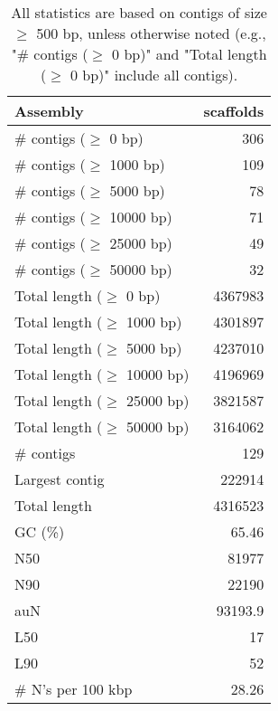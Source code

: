 \documentclass[12pt,a4paper]{article}
\begin{document}
\begin{table}[ht]
\begin{center}
\caption{All statistics are based on contigs of size $\geq$ 500 bp, unless otherwise noted (e.g., "\# contigs ($\geq$ 0 bp)" and "Total length ($\geq$ 0 bp)" include all contigs).}
\begin{tabular}{|l*{1}{|r}|}
\hline
Assembly & scaffolds \\ \hline
\# contigs ($\geq$ 0 bp) & 306 \\ \hline
\# contigs ($\geq$ 1000 bp) & 109 \\ \hline
\# contigs ($\geq$ 5000 bp) & 78 \\ \hline
\# contigs ($\geq$ 10000 bp) & 71 \\ \hline
\# contigs ($\geq$ 25000 bp) & 49 \\ \hline
\# contigs ($\geq$ 50000 bp) & 32 \\ \hline
Total length ($\geq$ 0 bp) & 4367983 \\ \hline
Total length ($\geq$ 1000 bp) & 4301897 \\ \hline
Total length ($\geq$ 5000 bp) & 4237010 \\ \hline
Total length ($\geq$ 10000 bp) & 4196969 \\ \hline
Total length ($\geq$ 25000 bp) & 3821587 \\ \hline
Total length ($\geq$ 50000 bp) & 3164062 \\ \hline
\# contigs & 129 \\ \hline
Largest contig & 222914 \\ \hline
Total length & 4316523 \\ \hline
GC (\%) & 65.46 \\ \hline
N50 & 81977 \\ \hline
N90 & 22190 \\ \hline
auN & 93193.9 \\ \hline
L50 & 17 \\ \hline
L90 & 52 \\ \hline
\# N's per 100 kbp & 28.26 \\ \hline
\end{tabular}
\end{center}
\end{table}
\end{document}
